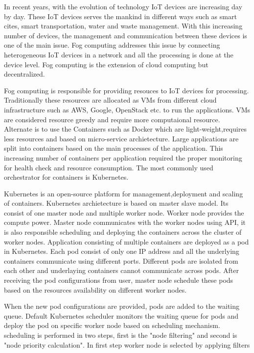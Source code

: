 \documentclass[12pt,twoside,doublepage]{article}
\begin{document}
In recent years, with the evolution of technology IoT devices are increasing day
by day. These IoT devices serves the mankind in different ways such as smart cites,
smart transportation, water and waste management. With this increasing number of devices,
the management and communication between these devices is one of the main issue. Fog computing
addresses this issue by connecting heterogeneous IoT devices in a network and all the processing
is done at the device level. Fog computing is the extension of cloud computing but decentralized.
\par
Fog computing is responsible for providing resouces to IoT devices for processing. Traditionally
these resources are allocated as VMs from different cloud infrastructure such as AWS, Google,
OpenStack etc. to run the applications. VMs are considered resource greedy
and require more computaional resource. Alternate is to use the Containers such as Docker
which are light-weight,requires less resources and based on micro-service archietecture. Large applications are split into
containers based on the main processes of the application. This increasing number of containers per application
required the proper monitoring for health check and resource consumption. The most commonly
used orchestrator for containers is Kubernetes.
\par
Kubernetes is an open-source platform for management,deployment and scaling of containers.
Kubernetes archietecture is based on master slave model. Its consist of
one master node and multiple worker node. Worker node provides the compute power. Master node communicates
with the worker nodes using API, it is also responsible scheduling and deploying the containers
across the cluster of worker nodes. Application consisting of multiple containers are deployed
as a pod in Kubernetes. Each pod consist of only one IP address and all the underlying containers
communicate using different ports. Different pods are isolated from each other and underlaying
containers cannot communicate across pods. After receiving the pod configurations from user, master node
schedule these pods based on the resources availability on different worker nodes.
\par
When the new pod configurations are provided, pods are added to the waiting queue. Default Kubernetes
scheduler monitors the waiting queue for pods and deploy the pod on specific worker node based on
scheduling mechanism. scheduling is performed in two steps, first is the "node filtering" and
second is "node priority calculation". In first step worker node is selected by applying filters \cite{k8s}
\end{document}
